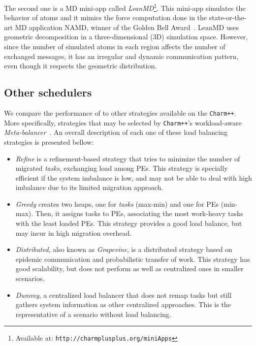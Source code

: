The second one is a MD mini-app called \textit{LeanMD}\footnote{Available at: \texttt{http://charmplusplus.org/miniApps}}.
This mini-app simulates the behavior of atoms and it mimics the force computation done in the state-or-the-art MD application NAMD, winner of the Golden Bell Award~\cite{grapevine}.
LeanMD uses geometric decomposition in a three-dimensional ($3$D) simulation space.
However, since the number of simulated atoms in each region affects the number of exchanged messages, it has an irregular and dynamic communication pattern, even though it respects the geometric distribution.

\subsection{Other schedulers}

We compare the performance of \packdrop to other strategies available on the \texttt{Charm++}.
More specifically, strategies that may be selected by \texttt{Charm++}'s workload-aware \textit{Meta-balancer}~\cite{MenonPHD}.
An overall description of each one of these load balancing strategies is presented bellow:

\begin{itemize}
	\item \textit{Refine} is a refinement-based strategy that tries to minimize the number of migrated \textit{tasks}, exchanging load among PEs.
This strategy is specially efficient if the system imbalance is low, and may not be able to deal with high imbalance due to its limited migration approach.
	\item \textit{Greedy} creates two heaps, one for \textit{tasks} (max-min) and one for PEs (min-max). 
Then, it assigns tasks to PEs, associating the most work-heavy tasks with the least loaded PEs.
This strategy provides a good load balance, but may incur in high migration overhead.
    \item \textit{Distributed}, also known as \textit{Grapevine}, is a distributed strategy based on epidemic communication and probabilistic transfer of work.
   This strategy has good scalability, but does not perform as well as centralized ones in smaller scenarios.
   \item \textit{Dummy}, a centralized load balancer that does not remap tasks but still gathers system information as other centralized approaches.
   This is the representative of a scenario without load balancing.

\end{itemize}



